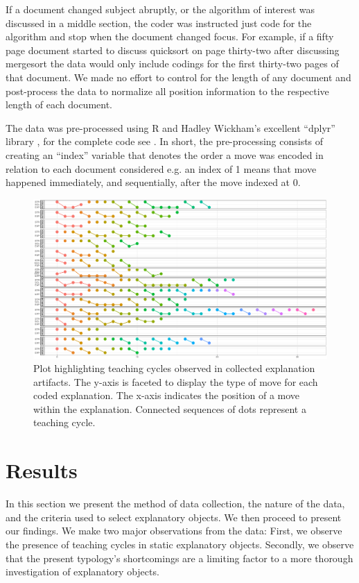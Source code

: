 \documentclass[conference]{IEEEtran}
\begin{document}
If a document changed subject abruptly, or the algorithm of interest was
discussed in a middle section, the coder was instructed just code for the
algorithm and stop when the document changed focus. For
example, if a fifty page document started to discuss quicksort on page
thirty-two after discussing mergesort the data would only include codings for
the first thirty-two pages of that document. We made no effort to control for
the length of any document and post-process the data to normalize all position
information to the respective length of each document.

The data was pre-processed using R and Hadley Wickham's excellent ``dplyr'' library
\cite{Dplyr}, for the complete code see . In short, the pre-processing consists of creating an
``index'' variable that denotes the order a move was encoded in relation to each
document considered e.g. an index of 1 means that move happened immediately, and
sequentially, after the move indexed at 0. 


\begin{figure}
\centering
\includegraphics[width=\textwidth]{teachCyclesPlt}
\caption{Plot highlighting teaching cycles observed in collected explanation
artifacts. The y-axis is faceted to display the type of move for each coded
explanation. The x-axis indicates the position of a move within the
explanation. Connected sequences of dots represent a teaching cycle.}
\label{fig:cycles-plot}
\end{figure}

\section{Results}
In this section we present the method of data collection, the nature of the
data, and the criteria used to select explanatory objects. We then proceed to
present our findings. We make two major observations from the data: First,
we observe the presence of teaching cycles in static explanatory objects.
Secondly, we observe that the present typology's shortcomings are a limiting
factor to a more thorough investigation of explanatory objects.
\end{document}
